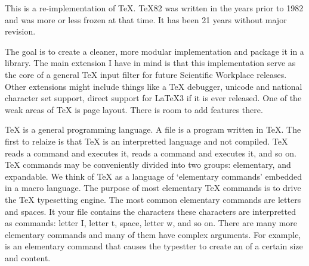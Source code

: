 


This is a re-implementation of TeX. \TeX82 was written in the years
prior to 1982 and was more or less frozen at that time. It has been
21 years without major revision.

The goal is to create a cleaner, more modular implementation and
package it in a library. The main extension I have in mind is that
this implementation serve as the core of a general \TeX{} input
filter for future Scientific Workplace releases.  Other extensions might
include things like a \TeX{} debugger, unicode and national character
set support, direct support for LaTeX3 if it is ever released. One of
the weak areas of \TeX{} is page layout. There is room to add features
there.


\TeX{} is a general programming language. A  file is a program
written in \TeX. The first to relaize is that \TeX{} is an interpretted
language and not compiled. \TeX{} reads a command and executes it,
reads a command and executes it, and so on. \TeX{} commands may be
conveniently divided into two groups: elementary, and expandable.
We think of \TeX{} as a language of `elementary commands'
embedded in a macro language.
The purpose of most elementary \TeX{} commands is to drive the
\TeX{} typesetting engine. The most common elementary commands are
letters and spaces. It your  file contains the characters
 these characters are interpretted as
commands: letter I, letter t, space, letter w, and so on. There are
many more elementary commands and many of them have complex arguments.
For example,  is an elementary command
that causes the typestter to create an  of a certain size
and content.

